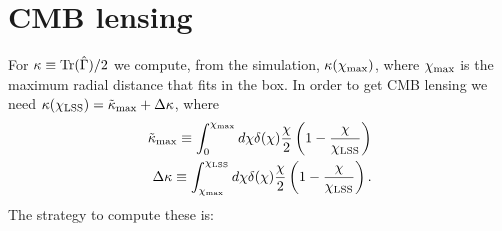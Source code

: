 \documentclass[a4paper,10pt]{article}
\begin{document}
\section{CMB lensing}
  For $\kappa\equiv{\rm Tr}(\hat{\Gamma})/2$ we compute, from the simulation, $\kappa(\chi_{\rm max})$,
  where $\chi_{\rm max}$ is the maximum radial distance that fits in the box. In order to get CMB
  lensing we need $\kappa(\chi_{\rm LSS})=\tilde{\kappa}_{\rm max}+\Delta\kappa$, where
  \begin{align}
    \tilde{\kappa}_{\rm max}\equiv\int_0^{\chi_{\rm max}}   d\chi\delta(\chi)\frac{\chi}{2}\left(1-\frac{\chi}{\chi_{\rm LSS}}\right)\\
    \Delta\kappa\equiv\int_{\chi_{\rm max}}^{\chi_{\rm LSS}}d\chi\delta(\chi)\frac{\chi}{2}\left(1-\frac{\chi}{\chi_{\rm LSS}}\right).
  \end{align}
  The strategy to compute these is:
\end{document}

